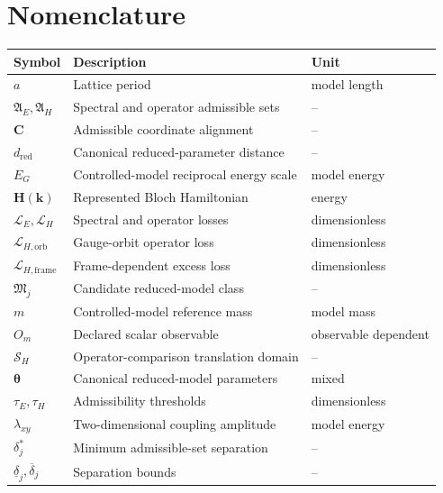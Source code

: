\documentclass[preprint,12pt]{elsarticle}
\begin{document}
\appendix


\clearpage

\clearpage

\clearpage

\clearpage

\clearpage


\section*{Nomenclature}
\begin{table}[ht]
\centering
\begin{tabular}{@{}lll@{}}
\toprule
Symbol & Description & Unit \\
\midrule
$a$ & Lattice period & model length \\
$\mathfrak{A}_E,\mathfrak{A}_H$ & Spectral and operator admissible sets & -- \\
$\bm{C}$ & Admissible coordinate alignment & -- \\
$d_{\mathrm{red}}$ & Canonical reduced-parameter distance & -- \\
$E_G$ & Controlled-model reciprocal energy scale & model energy \\
$\bm{H}(\bm{k})$ & Represented Bloch Hamiltonian & energy \\
$\mathcal{L}_E,\mathcal{L}_H$ & Spectral and operator losses & dimensionless \\
$\mathcal{L}_{H,\mathrm{orb}}$ & Gauge-orbit operator loss & dimensionless \\
$\mathcal{L}_{H,\mathrm{frame}}$ & Frame-dependent excess loss & dimensionless \\
$\mathfrak{M}_j$ & Candidate reduced-model class & -- \\
$m$ & Controlled-model reference mass & model mass \\
$O_m$ & Declared scalar observable & observable dependent \\
$\mathcal{S}_H$ & Operator-comparison translation domain & -- \\
$\bm{\theta}$ & Canonical reduced-model parameters & mixed \\
$\tau_E,\tau_H$ & Admissibility thresholds & dimensionless \\
$\lambda_{xy}$ & Two-dimensional coupling amplitude & model energy \\
$\delta_j^\ast$ & Minimum admissible-set separation & -- \\
$\underline{\delta}_j,\overline{\delta}_j$ & Separation bounds & -- \\
\bottomrule
\end{tabular}
\end{table}
\end{document}

